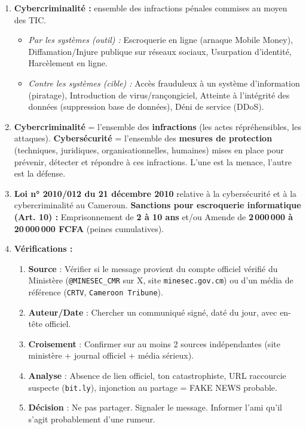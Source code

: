 \documentclass[11pt]{article}
\begin{document}
\begin{corrige}
\begin{enumerate}
\item \textbf{Cybercriminalité :} ensemble des infractions pénales commises au moyen des TIC.
      \begin{itemize}
      \item \emph{Par les systèmes (outil) :} Escroquerie en ligne (arnaque Mobile Money), Diffamation/Injure publique sur réseaux sociaux, Usurpation d'identité, Harcèlement en ligne.
      \item \emph{Contre les systèmes (cible) :} Accès frauduleux à un système d'information (piratage), Introduction de virus/rançongiciel, Atteinte à l'intégrité des données (suppression base de données), Déni de service (DDoS).
      \end{itemize}
\item \textbf{Cybercriminalité} = l'ensemble des \textbf{infractions} (les actes répréhensibles, les attaques). \textbf{Cybersécurité} = l'ensemble des \textbf{mesures de protection} (techniques, juridiques, organisationnelles, humaines) mises en place pour prévenir, détecter et répondre à ces infractions. L'une est la menace, l'autre est la défense.
\item \textbf{Loi n° 2010/012 du 21 décembre 2010} relative à la cybersécurité et à la cybercriminalité au Cameroun.
      \textbf{Sanctions pour escroquerie informatique (Art. 10) :} Emprisonnement de \textbf{2 à 10 ans} et/ou Amende de \textbf{2\,000\,000 à 20\,000\,000 FCFA} (peines cumulatives).
\item \textbf{Vérifications :}
      \begin{enumerate}
      \item \textbf{Source} : Vérifier si le message provient du compte officiel vérifié du Ministère (\texttt{@MINESEC\_CMR} sur X, site \texttt{minesec.gov.cm}) ou d'un média de référence (\texttt{CRTV}, \texttt{Cameroon Tribune}).
      \item \textbf{Auteur/Date} : Chercher un communiqué signé, daté du jour, avec en-tête officiel.
      \item \textbf{Croisement} : Confirmer sur au moins 2 sources indépendantes (site ministère + journal officiel + média sérieux).
      \item \textbf{Analyse} : Absence de lien officiel, ton catastrophiste, URL raccourcie suspecte (\texttt{bit.ly}), injonction au partage = FAKE NEWS probable.
      \item \textbf{Décision} : Ne pas partager. Signaler le message. Informer l'ami qu'il s'agit probablement d'une rumeur.

\end{enumerate}
\end{enumerate}
\end{corrige}
\end{document}
